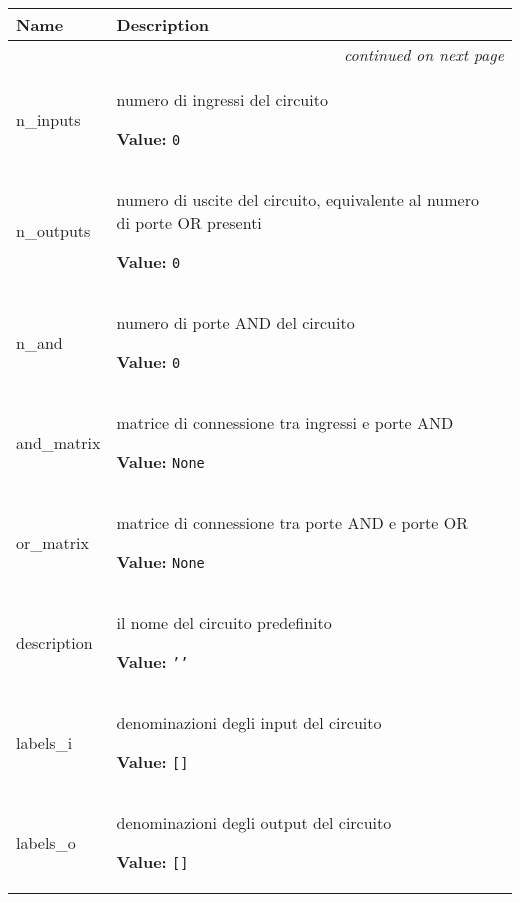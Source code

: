     \vspace{-1cm}
\hspace{\varindent}\begin{longtable}{|p{\varnamewidth}|p{\vardescrwidth}|l}
\cline{1-2}
\cline{1-2} \centering \textbf{Name} & \centering \textbf{Description}& \\
\cline{1-2}
\endhead\cline{1-2}\multicolumn{3}{r}{\small\textit{continued on next page}}\\\endfoot\cline{1-2}
\endlastfoot\raggedright n\-\_\-i\-n\-p\-u\-t\-s\- & \raggedright numero di ingressi del circuito

\textbf{Value:} 
{\tt 0}&\\
\cline{1-2}
\raggedright n\-\_\-o\-u\-t\-p\-u\-t\-s\- & \raggedright numero di uscite del circuito, equivalente al numero di porte OR 
          presenti

\textbf{Value:} 
{\tt 0}&\\
\cline{1-2}
\raggedright n\-\_\-a\-n\-d\- & \raggedright numero di porte AND del circuito

\textbf{Value:} 
{\tt 0}&\\
\cline{1-2}
\raggedright a\-n\-d\-\_\-m\-a\-t\-r\-i\-x\- & \raggedright matrice di connessione tra ingressi e porte AND

\textbf{Value:} 
{\tt None}&\\
\cline{1-2}
\raggedright o\-r\-\_\-m\-a\-t\-r\-i\-x\- & \raggedright matrice di connessione tra porte AND e porte OR

\textbf{Value:} 
{\tt None}&\\
\cline{1-2}
\raggedright d\-e\-s\-c\-r\-i\-p\-t\-i\-o\-n\- & \raggedright il nome del circuito predefinito

\textbf{Value:} 
{\tt \texttt{'}\texttt{}\texttt{'}}&\\
\cline{1-2}
\raggedright l\-a\-b\-e\-l\-s\-\_\-i\- & \raggedright denominazioni degli input del circuito

\textbf{Value:} 
{\tt \texttt{[}\texttt{]}}&\\
\cline{1-2}
\raggedright l\-a\-b\-e\-l\-s\-\_\-o\- & \raggedright denominazioni degli output del circuito

\textbf{Value:} 
{\tt \texttt{[}\texttt{]}}&\\
\cline{1-2}
\end{longtable}

